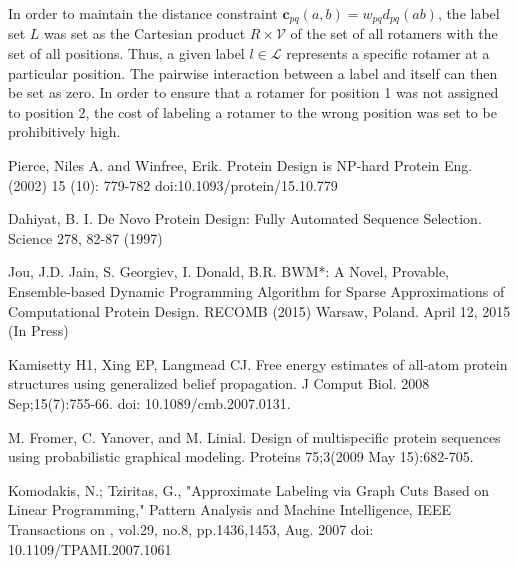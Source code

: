 \documentclass[11pt]{article}
\begin{document}
	In order to maintain the distance constraint 
	$\textbf{c}_{pq}(a,b) =  w_{pq}d_{pq}(ab)$, the label set $L$ was set as the
	Cartesian product $R \times \mathcal{V}$ of the set of all rotamers with the set
	of all positions. Thus, a given label $l \in \mathcal{L}$ represents a specific
	rotamer at a particular position. The pairwise interaction between a label and
	itself can then be set as zero. In order to ensure that a rotamer for position 1
	was not assigned to position 2, the cost of labeling a rotamer to the wrong
	position was set to be prohibitively high. 
	
	


	\begin{thebibliography}{99}
	
	 Pierce, Niles A. and Winfree, Erik. Protein Design is NP-hard 
	Protein Eng. (2002) 15 (10): 779-782 doi:10.1093/protein/15.10.779
	
	 Dahiyat, B. I. De Novo Protein Design: Fully Automated Sequence
	Selection. Science 278, 82-87 (1997)	

	 Jou, J.D. Jain, S. Georgiev, I. Donald, B.R. BWM*: A Novel,
	Provable, Ensemble-based Dynamic Programming Algorithm for Sparse 
	Approximations of Computational Protein Design. RECOMB (2015) Warsaw, Poland.
	April 12, 2015 (In Press)

	 Kamisetty H1, Xing EP, Langmead CJ. Free energy estimates of
	all-atom protein structures using generalized belief propagation. J Comput
	Biol. 2008 Sep;15(7):755-66. doi: 10.1089/cmb.2007.0131.
		
	 M. Fromer, C. Yanover, and M. Linial. Design of multispecific
	protein sequences using probabilistic graphical modeling. Proteins 75;3(2009
	May 15):682-705.

	 Komodakis, N.; Tziritas, G., "Approximate Labeling
	via Graph Cuts Based on Linear Programming," Pattern Analysis and Machine
	Intelligence, IEEE Transactions on , vol.29, no.8, pp.1436,1453, Aug. 2007
	doi: 10.1109/TPAMI.2007.1061	
	
	
	\end{thebibliography}
\end{document}
